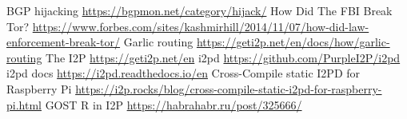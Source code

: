 \documentclass[10pt, a5paper]{article}
\begin{document}
\begin{thebibliography}{20}

 BGP hijacking \url{https://bgpmon.net/category/hijack/}
How Did The FBI Break Tor? \url{https://www.forbes.com/sites/kashmirhill/2014/11/07/how-did-law-enforcement-break-tor/}
 Garlic routing \url{https://geti2p.net/en/docs/how/garlic-routing}
 The I2P \url{https://geti2p.net/en}
 i2pd \url{https://github.com/PurpleI2P/i2pd}
 i2pd docs \url{https://i2pd.readthedocs.io/en}
 Cross-Compile static I2PD for Raspberry Pi \url{https://i2p.rocks/blog/cross-compile-static-i2pd-for-raspberry-pi.html}
 GOST R in I2P \url{https://habrahabr.ru/post/325666/}
\end{thebibliography}
\end{document}
